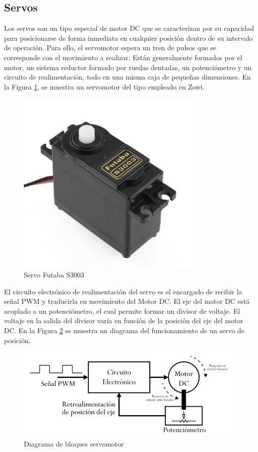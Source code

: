 \subsection{Servos}
Los servos son un tipo especial de motor DC que se caracterizan por su capacidad para posicionarse de forma inmediata en cualquier posición dentro de su intervalo de operación. Para ello, el servomotor espera un tren de pulsos que se corresponde con el movimiento a realizar. Están generalmente formados por el motor, un sistema reductor formado por ruedas dentadas, un potenciómetro y un circuito de realimentación, todo en una misma caja de pequeñas dimensiones. En la Figura \ref{fig:futaba}, se muestra un servomotor del tipo empleado en Zowi.

\begin{figure}[h]
\centering
\includegraphics[width=90mm]{Figures/futaba.png}
\caption[Servo Futaba S3003]{Servo Futaba S3003}
\label{fig:futaba}
\end{figure}

El circuito electrónico de realimentación del servo es el encargado de recibir la señal PWM y traducirla en movimiento del Motor DC. El eje del motor DC está acoplado a un potenciómetro, el cual permite formar un divisor de voltaje. El voltaje en la salida del divisor varía en función de la posición del eje del motor DC. En la Figura \ref{fig:ServoDiag} se muestra un diagrama del funcionamiento de un servo de posición.

\begin{figure}[h]
\centering
\includegraphics[width=140mm]{Figures/servo-diag.png}
\caption[Diagrama de bloques servomotor]{Diagrama de bloques servomotor}
\label{fig:ServoDiag}
\end{figure}


